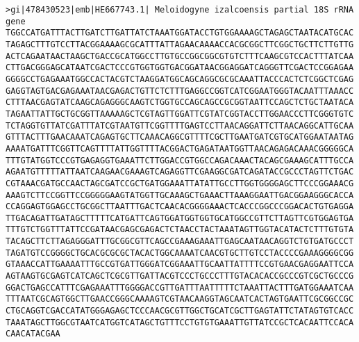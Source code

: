 \documentclass[11pt]{article}
\begin{document}
\begin{Verbatim}[commandchars=\\\{\}]
>gi|478430523|emb|HE667743.1| Meloidogyne izalcoensis partial 18S rRNA gene
TGGCCATGATTTACTTGATCTTGATTATCTAAATGGATACCTGTGGAAAAGCTAGAGCTAATACATGCAC
TAGAGCTTTGTCCTTACGGAAAAGCGCATTTATTAGAACAAAACCACGCGGCTTCGGCTGCTTCTTGTTG
ACTCAGAATAACTAAGCTGACCGCATGGCCTTGTGCCGGCGGCGTGTCTTTCAAGCGTCCACTTTATCAA
CTTGACGGGAGCATAATCGACTCCCGTGGTGGTGACGGATAACGGAGGATCAGGGTTCGACTCCGGAGAA
GGGGCCTGAGAAATGGCCACTACGTCTAAGGATGGCAGCAGGCGCGCAAATTACCCACTCTCGGCTCGAG
GAGGTAGTGACGAGAAATAACGAGACTGTTCTCTTTGAGGCCGGTCATCGGAATGGGTACAATTTAAACC
CTTTAACGAGTATCAAGCAGAGGGCAAGTCTGGTGCCAGCAGCCGCGGTAATTCCAGCTCTGCTAATACA
TAGAATTATTGCTGCGGTTAAAAAGCTCGTAGTTGGATTCGTATCGGTACCTTGGAACCCTTCGGGTGTC
TCTAGGTGTTATCGATTTATCGTAATGTTCGGTTTTGAGTCCTTAACAGGATTCTTAACAGGCATTGCAA
GTTTACTTTGAACAAATCAGAGTGCTTCAAACAGGCGTTTTCGCTTGAATGATCGTGCATGGAATAATAG
AAAATGATTTCGGTTCAGTTTTATTGGTTTTACGGACTGAGATAATGGTTAACAGAGACAAACGGGGGCA
TTTGTATGGTCCCGTGAGAGGTGAAATTCTTGGACCGTGGCCAGACAAACTACAGCGAAAGCATTTGCCA
AGAATGTTTTTATTAATCAAGAACGAAAGTCAGAGGTTCGAAGGCGATCAGATACCGCCCTAGTTCTGAC
CGTAAACGATGCCAACTAGCGATCCGCTGATGGAAATTATATTGCCTTGGTGGGGAGCTTCCCGGAAACG
AAAGTCTTCCGGTTCCGGGGGAAGTATGGTTGCAAAGCTGAAACTTAAAGGAATTGACGGAAGGGCACCA
CCAGGAGTGGAGCCTGCGGCTTAATTTGACTCAACACGGGGAAACTCACCCGGCCCGGACACTGTGAGGA
TTGACAGATTGATAGCTTTTTCATGATTCAGTGGATGGTGGTGCATGGCCGTTCTTAGTTCGTGGAGTGA
TTTGTCTGGTTTATTCCGATAACGAGCGAGACTCTAACCTACTAAATAGTTGGTACATACTCTTTGTGTA
TACAGCTTCTTAGAGGGATTTGCGGCGTTCAGCCGAAAGAAATTGAGCAATAACAGGTCTGTGATGCCCT
TAGATGTCCGGGGCTGCACGCGCGCTACACTGGCAAAATCAACGTGCTTGTCCTACCCCGAAAGGGGCGG
GTAAACCATTGAAAATTTGCCGTGATTGGGATCGGAAATTGCAATTATTTTCCGTGAACGAGGAATTCCA
AGTAAGTGCGAGTCATCAGCTCGCGTTGATTACGTCCCTGCCCTTTGTACACACCGCCCGTCGCTGCCCG
GGACTGAGCCATTTCGAGAAATTTGGGGACCGTTGATTTAATTTTTCTAAATTACTTTGATGGAAATCAA
TTTAATCGCAGTGGCTTGAACCGGGCAAAAGTCGTAACAAGGTAGCAATCACTAGTGAATTCGCGGCCGC
CTGCAGGTCGACCATATGGGAGAGCTCCCAACGCGTTGGCTGCATCGCTTGAGTATTCTATAGTGTCACC
TAAATAGCTTGGCGTAATCATGGTCATAGCTGTTTCCTGTGTGAAATTGTTATCCGCTCACAATTCCACA
CAACATACGAA


\end{Verbatim}
\end{document}
